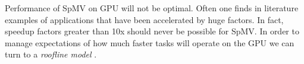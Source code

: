 \documentclass{report}
\begin{document}
Performance of SpMV on GPU will not be optimal. Often one finds in literature examples of applications that have been accelerated by huge factors. In fact, speedup factors greater than 10x should never be possible for SpMV. In order to manage expectations of how much faster tasks will operate on the GPU we can turn to a \emph{roofline model} \cite{Williams2009}.






\end{document}
